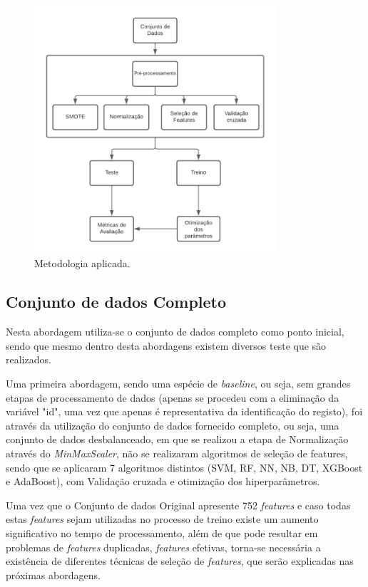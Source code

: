 \documentclass[12pt,a4paper,twoside]{report}
\begin{document}
{\begin{figure}[H]
    \centering
    \includegraphics[width=0.8\textwidth]{imagens/metodologia.png}
    \caption{Metodologia aplicada.}
    \label{fig:methodology}
\end{figure}


\subsection{Conjunto de dados Completo}

Nesta abordagem utiliza-se o conjunto de dados completo como ponto inicial, sendo que mesmo dentro desta abordagens existem diversos teste que são realizados. 

Uma primeira abordagem, sendo uma espécie de \textit{baseline}, ou seja, sem grandes etapas de processamento de dados (apenas se procedeu com a eliminação da variável "id", uma vez que apenas é representativa da identificação do registo), foi através da utilização do conjunto de dados fornecido completo, ou seja, uma conjunto de dados desbalanceado, em que se realizou a etapa de Normalização através do \textit{MinMaxScaler}, não se realizaram algoritmos de seleção de features, sendo que se aplicaram 7 algoritmos distintos (\gls{SVM}, \Gls{RF}, \gls{NN}, \gls{NB}, \Gls{DT}, \Gls{XGBoost} e \gls{AdaBoost}), com Validação cruzada e otimização dos hiperparâmetros.

Uma vez que o Conjunto de dados Original apresente 752 \textit{features} e caso todas estas \textit{features} sejam utilizadas no processo de treino existe um aumento significativo no tempo de processamento, além de que pode resultar em problemas de \textit{features} duplicadas, \textit{features} efetivas, torna-se necessária a existência de diferentes técnicas de seleção de \textit{features}, que serão explicadas nas próximas abordagens.

}
\end{document}
